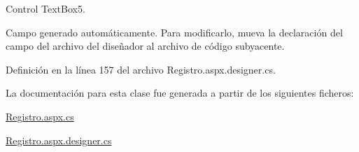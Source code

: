 Control Text\+Box5. 

Campo generado automáticamente. Para modificarlo, mueva la declaración del campo del archivo del diseñador al archivo de código subyacente. 

Definición en la línea 157 del archivo Registro.\+aspx.\+designer.\+cs.



La documentación para esta clase fue generada a partir de los siguientes ficheros\+:\begin{DoxyCompactItemize}
\item 
\mbox{\hyperlink{Registro_8aspx_8cs}{Registro.\+aspx.\+cs}}\item 
\mbox{\hyperlink{Registro_8aspx_8designer_8cs}{Registro.\+aspx.\+designer.\+cs}}\end{DoxyCompactItemize}
